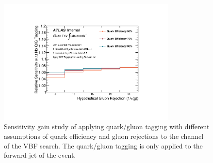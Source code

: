 

\begin{figure}[htpb]
\begin{center}
\includegraphics[width=0.8\textwidth]{figures/CNN/Relative_Gain.pdf}
\caption{Sensitivity gain study of applying quark/gluon tagging with different assumptions of quark efficiency and gluon rejections to the \twocentral channel of the VBF \Hbb search. The quark/gluon tagging is only applied to the forward jet of the event.}
\label{fig:cnn-gain}
\end{center}
\end{figure}
